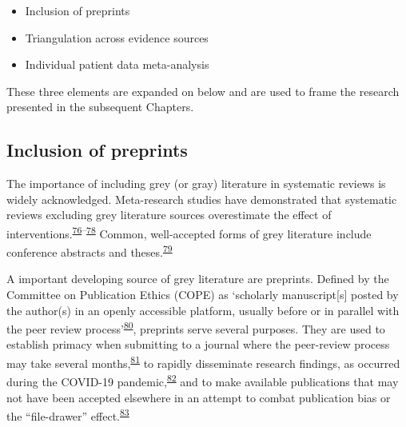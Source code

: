 \documentclass[a4paper, twoside]{templates/ociamthesis}
\providecommand{\tightlist}{%
  \setlength{\itemsep}{0pt}\setlength{\parskip}{0pt}}
\begin{document}
\begin{itemize}
\tightlist
\item
  Inclusion of preprints
\item
  Triangulation across evidence sources
\item
  Individual patient data meta-analysis
\end{itemize}

These three elements are expanded on below and are used to frame the research presented in the subsequent Chapters.

\hypertarget{diverse-sources-preprints}{%
\subsection{Inclusion of preprints}\label{diverse-sources-preprints}}

The importance of including grey (or gray) literature in systematic reviews is widely acknowledged. Meta-research studies have demonstrated that systematic reviews excluding grey literature sources overestimate the effect of interventions.\textsuperscript{\protect\hyperlink{ref-conn2003}{76}--\protect\hyperlink{ref-hopewell2007}{78}} Common, well-accepted forms of grey literature include conference abstracts and theses.\textsuperscript{\protect\hyperlink{ref-lefebvre2019searching}{79}}

A important developing source of grey literature are preprints. Defined by the Committee on Publication Ethics (COPE) as `scholarly manuscript{[}s{]} posted by the author(s) in an openly accessible platform, usually before or in parallel with the peer review process'\textsuperscript{\protect\hyperlink{ref-committeeonpublicationethicscope2018}{80}}, preprints serve several purposes. They are used to establish primacy when submitting to a journal where the peer-review process may take several months,\textsuperscript{\protect\hyperlink{ref-vale2016}{81}} to rapidly disseminate research findings, as occurred during the COVID-19 pandemic,\textsuperscript{\protect\hyperlink{ref-fraser2020preprinting}{82}} and to make available publications that may not have been accepted elsewhere in an attempt to combat publication bias or the ``file-drawer'' effect.\textsuperscript{\protect\hyperlink{ref-rosenthal1979}{83}}
\end{document}
